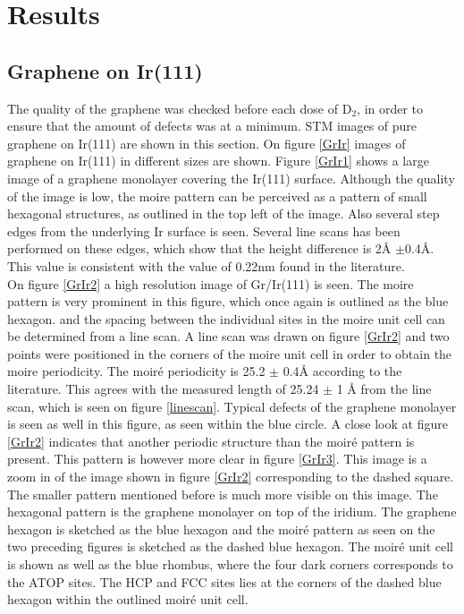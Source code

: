 \chapter{Results}
\label{cha:results}
\section{Graphene on Ir(111)}

The quality of the graphene was checked before each dose of D$_2$, in order to ensure that the amount of defects was at a minimum. STM images of pure graphene on Ir(111) are shown in this section. On figure \ref{GrIr} images of graphene on Ir(111) in different sizes are shown. Figure \ref{GrIr1} shows a large image of a graphene monolayer covering the Ir(111) surface. Although the quality of the image is low, the moire pattern can be perceived as a pattern of small hexagonal structures, as outlined in the top left of the image. Also several step edges from the underlying Ir surface is seen. Several line scans has been performed on these edges, which show that the height difference is 2Å $\pm$0.4Å. This value is consistent with the value of 0.22nm found in the literature.\cite{1367-2630-11-2-023006}\\
On figure \ref{GrIr2} a high resolution image of Gr/Ir(111) is seen. The moire pattern is very prominent in this figure, which once again is outlined as the blue hexagon.  and the spacing between the individual sites in the moire unit cell can be determined from a line scan. A line scan was drawn on figure \ref{GrIr2} and two points were positioned in the corners of the moire unit cell in order to obtain the moire periodicity. The moiré periodicity is 25.2 $\pm$ 0.4Å according to the literature.\cite{1367-2630-10-4-043033} This agrees with the measured length of 25.24 $\pm$ 1 Å from the line scan, which is seen on figure \ref{linescan}. Typical defects of the graphene monolayer is seen as well in this figure, as seen within the blue circle. A close look at figure \ref{GrIr2} indicates that another periodic structure than the moiré pattern is present. This pattern is however more clear in figure \ref{GrIr3}. This image is a zoom in of the image shown in figure \ref{GrIr2} corresponding to the dashed square. The smaller pattern mentioned before is much more visible on this image. The hexagonal pattern is the graphene monolayer on top of the iridium. The graphene hexagon is sketched as the blue hexagon and the moiré pattern as seen on the two preceding figures is sketched as the dashed blue hexagon. The moiré unit cell is shown as well as the blue rhombus, where the four dark corners corresponds to the ATOP sites. The HCP and FCC sites lies at the corners of the dashed blue hexagon within the outlined moiré unit cell.

